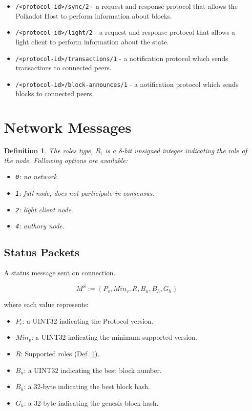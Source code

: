 \documentclass{book}
\newtheorem{definition}{Definition}
\begin{document}
\begin{itemize}
    \item \verb|/<protocol-id>/sync/2| - a request and response protocol that
    allows the Polkadot Host to perform information about blocks.
    \item \verb|/<protocol-id>/light/2| - a request and response protocol that
    allows a light client to perform information about the state.
    \item \verb|/<protocol-id>/transactions/1| - a notification protocol which
    sends transactions to connected peers.
    \item \verb|/<protocol-id>/block-announces/1| - a notification protocol
    which sends blocks to connected peers.
\end{itemize}

\section{Network Messages}

\begin{definition}
    \label{defn-roles}
    The roles type, $R$, is a 8-bit unsigned integer indicating the role of the
    node. Following options are available:

    \begin{itemize}
        \item \verb|0|: no network.
        \item \verb|1|: full node, does not participate in consensus.
        \item \verb|2|: light client node.
        \item \verb|4|: authory node.
    \end{itemize}
\end{definition}

\subsection{Status Packets}

A status message sent on connection.

\[
    M^S := (P_v, Min_v, R, B_n, B_h, G_h)
\]

where each value represents:

\begin{itemize}
    \item $P_v$: a UINT32 indicating the Protocol version.
    \item $Min_v$: a UINT32 indicating the minimum supported version.
    \item $R$: Supported roles (Def. \ref{defn-roles}).
    \item $B_n$: a UINT32 indicating the best block number.
    \item $B_h$: a 32-byte indicating the best block hash.
    \item $G_h$: a 32-byte indicating the genesis block hash.
\end{itemize}
\end{document}
